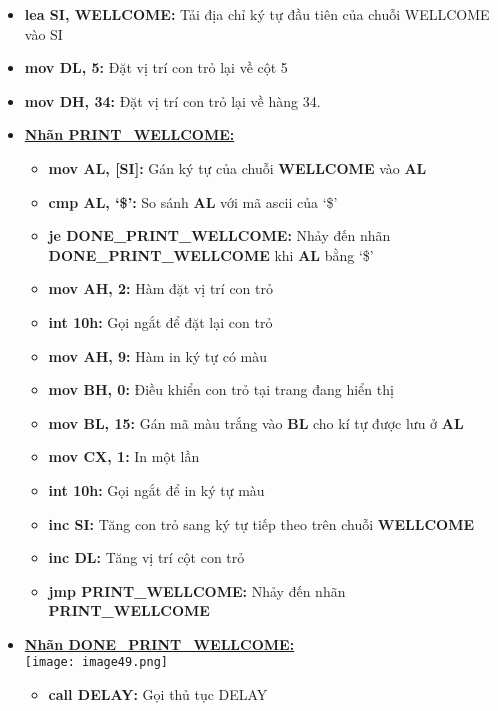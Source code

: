 \begin{itemize}
    \item \textbf{lea SI, WELLCOME:} Tải địa chỉ ký tự đầu tiên của chuỗi WELLCOME vào SI
    \item \textbf{mov DL, 5:} Đặt vị trí con trỏ lại về cột 5 
    \item \textbf{mov DH, 34:} Đặt vị trí con trỏ lại về hàng 34.
    \item \textbf{\underline{Nhãn PRINT\_WELLCOME:}}\\
    \begin{itemize}
        \item \textbf{mov AL, [SI]:} Gán ký tự của chuỗi \textbf{WELLCOME} vào \textbf{AL}
        \item \textbf{cmp AL, ‘\$’:} So sánh \textbf{AL} với mã ascii của ‘\$’ 
        \item \textbf{je DONE\_PRINT\_WELLCOME:} Nhảy đến nhãn \textbf{DONE\_PRINT\_WELLCOME} khi \textbf{AL} bằng ‘\$’
        \item \textbf{mov AH, 2:} Hàm đặt vị trí con trỏ
        \item \textbf{int 10h:} Gọi ngắt để đặt lại con trỏ
        \item \textbf{mov AH, 9:} Hàm in ký tự có màu
        \item \textbf{mov BH, 0:} Điều khiển con trỏ tại trang đang hiển thị 
        \item \textbf{mov BL, 15:} Gán mã màu trắng vào \textbf{BL} cho kí tự được lưu ở \textbf{AL} 
        \item \textbf{mov CX, 1:} In một lần 
        \item \textbf{int 10h:} Gọi ngắt để in ký tự màu
        \item \textbf{inc SI:} Tăng con trỏ sang ký tự tiếp theo trên chuỗi \textbf{WELLCOME}
        \item \textbf{inc DL:} Tăng vị trí cột con trỏ 
        \item \textbf{jmp PRINT\_WELLCOME:} Nhảy đến nhãn \textbf{PRINT\_WELLCOME}
    \end{itemize}
    \item \textbf{\underline{Nhãn DONE\_PRINT\_WELLCOME:}}\\
    \texttt{[image: image49.png]}
    \begin{itemize}
        \item \textbf{call DELAY:} Gọi thủ tục DELAY 

\end{itemize}
\end{itemize}
